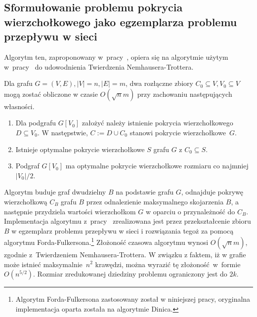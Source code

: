 \subsection{Sformułowanie problemu pokrycia wierzchołkowego jako egzemplarza problemu przepływu w sieci}\label{Kernelization_network_flow}
Algorytm ten, zaproponowany w~pracy~\cite{KernelizationAlgorithms04}, opiera się na
algorytmie użytym w~pracy~\cite{Niedermeier02} do udowodnienia Twierdzenia
Nemhausera-Trottera.

\begin{theorem}
  Dla grafu $G=(V,E), |V|=n, |E|=m$, dwa rozłączne zbiory $C_0 \subseteq V,
  V_0 \subseteq V$ mogą zostać obliczone w czasie $O(\sqrt{n}m)$ przy zachowaniu
  następujących własności.
  \begin{enumerate}
    \item Dla podgrafu $G[V_0]$ założyć należy istnienie pokrycia wierzchołkowego $D \subseteq
      V_0$. W następstwie, $C := D \cup C_0$ stanowi pokrycie wierzchołkowe~$G$.
    \item Istnieje optymalne pokrycie wierzchołkowe $S$ grafu $G$ z $C_0
      \subseteq S$.
    \item Podgraf $G[V_0]$ ma optymalne pokrycie wierzchołkowe rozmiaru co
      najmniej $|V_0|/2$. 
  \end{enumerate}
\end{theorem}

Algorytm buduje graf dwudzielny $B$ na podstawie grafu $G$, odnajduje pokrywę
wierzchołkową $C_B$ grafu $B$ przez odnalezienie maksymalnego skojarzenia $B$,
a następnie przydziela wartości wierzchołkom $G$ w oparciu o przynależność do
$C_B$.
Implementacja algorytmu z~pracy~\cite{Niedermeier02} zrealizowana jest przez
przekształcenie zbioru $B$ w egzemplarz problemu przepływu w sieci i rozwiązania tegoż
za pomocą algorytmu Forda-Fulkersona.\footnote{Algorytm Forda-Fulkersona
  zastosowany został w niniejszej pracy, oryginalna implementacja oparta została
na algorytmie Dinica.}
Złożoność czasowa algorytmu wynosi $O(\sqrt{n}m)$, zgodnie z~Twierdzeniem
Nemhausera-Trottera. 
W związku z faktem, iż w grafie może istnieć maksymalnie~$n^2$ krawędzi, można
wyrazić tę złożoność~w~formie $O(n^{5/2})$.
Rozmiar zredukowanej dziedziny problemu ograniczony jest do $2k$.

